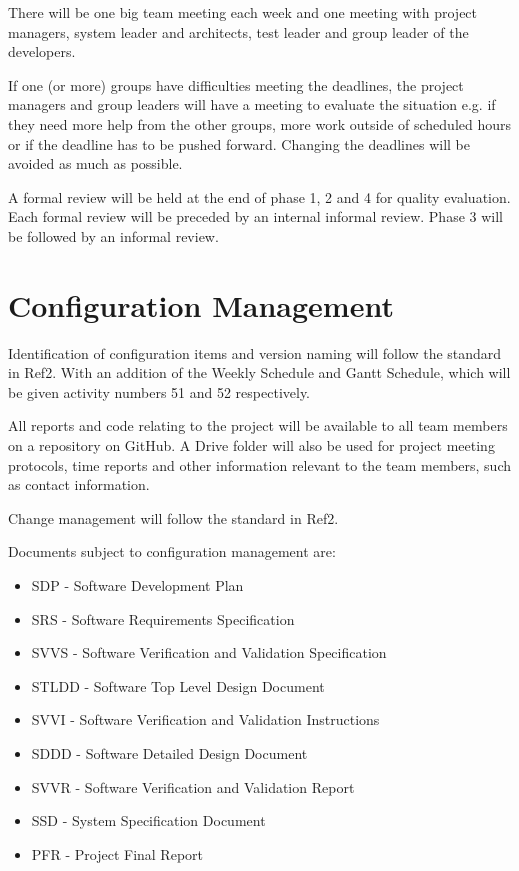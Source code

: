 \documentclass[a4paper]{article}
\begin{document}
There will be one big team meeting each week and one meeting with project managers, system leader and architects, test leader and group leader of the developers.

If one (or more) groups have difficulties meeting the deadlines, the project managers and group leaders will have a meeting to evaluate the situation e.g. if they need more help from the other groups, more work outside of scheduled hours or if the deadline has to be pushed forward. Changing the deadlines will be avoided as much as possible.

A formal review will be held at the end of phase 1, 2 and 4 for quality evaluation. Each formal review will be preceded by an internal informal review. Phase 3 will be followed by an informal review.

\section{Configuration Management}
Identification of configuration items and version naming will follow the standard in Ref2. With an addition of the Weekly Schedule and Gantt Schedule, which will be given activity numbers 51 and 52 respectively.

All reports and code relating to the project will be available to all team members on a repository on GitHub. A Drive folder will also be used for project meeting protocols, time reports and other information relevant to the team members, such as contact information.

Change management will follow the standard in Ref2.

Documents subject to configuration management are:
\begin{itemize}
\item SDP - Software Development Plan
\item SRS - Software Requirements Specification
\item SVVS - Software Verification and Validation Specification
\item STLDD - Software Top Level Design Document
\item SVVI - Software Verification and Validation Instructions
\item SDDD - Software Detailed Design Document
\item SVVR - Software Verification and Validation Report
\item SSD - System Specification Document
\item PFR - Project Final Report
\end{itemize}
\end{document}
